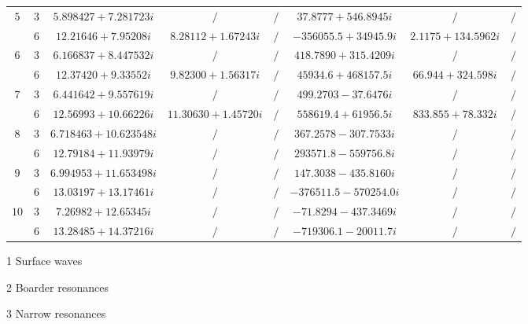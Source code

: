 \documentclass[aps,prd,longbibliography,reprint,twocolumn,amsmath,amssymb,amsfonts,showpacs,superscriptaddress]{revtex4-1}%
\begin{document}
\begin{table}[htp]
\begin{threeparttable}[htp]
\begin{ruledtabular}
\begin{tabular}{cccccccc}
$5$  & $3$  & $5.898427+7.281723 i $  & $ /$  & $/ $  & $37.8777+546.8945 i $ & $ /$ & $/ $  \\
     & $6$  & $  12.21646+7.95208 i $  & $ 8.28112+1.67243 i  $  & $ /$  & $ -356055.5+34945.9 i$ & $ 2.1175+134.5962 i $ & $/ $  \\

$6$  & $3$  & $ 6.166837+8.447532 i $  & $/ $  & $ /$  & $418.7890+315.4209 i$ & $/ $ & $/ $  \\
     & $6$  & $ 12.37420+9.33552 i $  & $ 9.82300+1.56317 i$  & $/ $  & $45934.6+468157.5 i $ & $ 66.944+324.598 i$ & $/ $  \\

$7$  & $3$  & $ 6.441642+9.557619 i $  & $ /$  & $/ $  & $499.2703-37.6476 i $ & $ /$ & $ /$  \\
     & $6$  & $12.56993+10.66226 i $  & $ 11.30630+1.45720 i  $  & $ /$  & $558619.4+61956.5 i $ & $ 833.855+78.332 i $ & $/ $  \\

$8$  & $3$  & $6.718463+10.623548 i $  & $ /$  & $/ $  & $ 367.2578-307.7533 i  $ & $ /$ & $/ $  \\
     & $6$  & $12.79184+11.93979 i $  & $/ $  & $/ $  & $ 293571.8-559756.8 i $ & $/ $ & $/ $  \\

$9$  & $3$  & $ 6.994953+11.653498 i $  & $/ $  & $/ $  & $147.3038-435.8160 i  $ & $ /$ & $/ $  \\
     & $6$  & $ 13.03197+13.17461 i  $  & $/ $  & $/ $  & $ -376511.5-570254.0 i  $ & $/$ & $ /$  \\

$10$ & $3$  & $7.26982+12.65345 i $  & $/ $  & $/ $  & $-71.8294-437.3469 i  $ & $/ $ & $ /$  \\
     & $6$  & $ 13.28485+14.37216 i$  & $ /$  & $/ $  & $ -719306.1-20011.7 i $ & $ /$ & $/ $  \\

\end{tabular}
\end{ruledtabular}
\begin{tablenotes}
     \item[1] Surface waves
     \item[2] Boarder resonances
     \item[3] Narrow  resonances
   \end{tablenotes}
\end{threeparttable}
\end{table}
\endgroup
\end{document}

